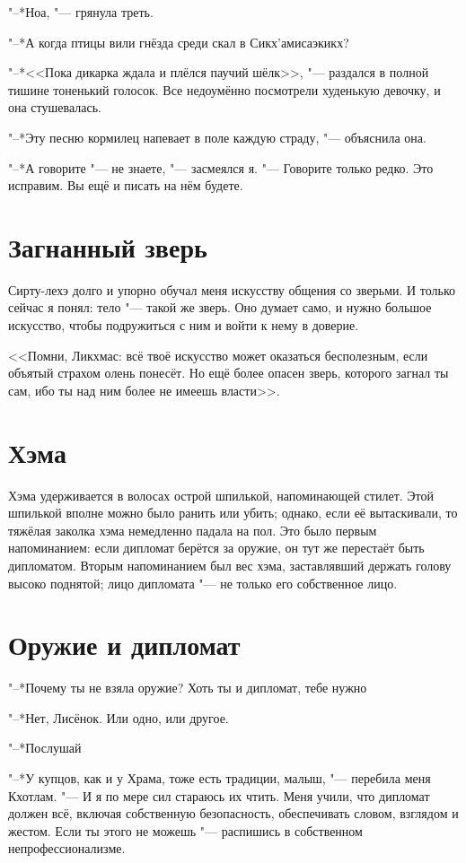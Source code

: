 \documentclass[a4paper,10pt]{book}
\newcommand{\ldotst}{\so{...}\xspace}
\begin{document}
"--*Ноа, "--- грянула треть.

"--*А когда птицы вили гнёзда среди скал в Сикх'амисаэкикх?

"--*<<Пока дикарка ждала и плёлся паучий шёлк>>, "--- раздался в полной тишине 
тоненький голосок.
Все недоумённо посмотрели худенькую девочку, и она стушевалась.

"--*Эту песню кормилец напевает в поле каждую страду, "--- объяснила она.

"--*А говорите "--- не знаете, "--- засмеялся я. "--- Говорите только редко.
Это исправим. Вы ещё и писать на нём будете.

 \section{Загнанный зверь}

Сирту-лехэ долго и упорно обучал меня искусству общения со зверьми. И только 
сейчас я понял: 
тело "--- такой же зверь. Оно думает само, и нужно большое искусство, чтобы 
подружиться с ним и войти к нему в доверие.

<<Помни, Ликхмас: всё твоё искусство может оказаться бесполезным, если объятый 
страхом олень понесёт.
Но ещё более опасен зверь, которого загнал ты сам, ибо ты над ним более не имеешь власти>>.

\section{Хэма}

Хэма удерживается в волосах острой шпилькой, напоминающей стилет. Этой шпилькой 
вполне можно было ранить или убить;
однако, если её вытаскивали, то тяжёлая заколка хэма немедленно падала на пол. 
Это было первым напоминанием: если дипломат берётся за оружие,
он тут же перестаёт быть дипломатом. Вторым напоминанием был вес хэма, 
заставлявший держать голову высоко поднятой; лицо дипломата "---
не только его собственное лицо.

\section{Оружие и дипломат}

"--*Почему ты не взяла оружие? Хоть ты и дипломат, тебе нужно\ldotst

"--*Нет, Лисёнок. Или одно, или другое.

"--*Послушай\ldotst

"--*У купцов, как и у Храма, тоже есть традиции, малыш, "--- перебила меня 
Кхотлам.
"--- И я по мере сил стараюсь их чтить. Меня учили, что дипломат должен всё,
включая собственную безопасность, обеспечивать словом, взглядом и жестом.
Если ты этого не можешь "--- распишись в собственном непрофессионализме.
\end{document}
